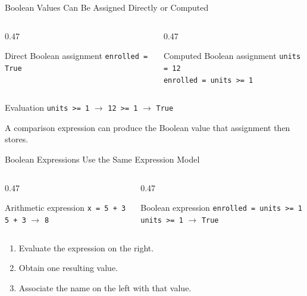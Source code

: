 \documentclass[aspectratio=169,10pt]{beamer}
\begin{document}
\begin{frame}{Boolean Values Can Be Assigned Directly or Computed}
  \begin{columns}[T,onlytextwidth]
    \begin{column}{0.47\textwidth}
      \begin{block}{Direct Boolean assignment}
        \centering
        \texttt{enrolled = True}
      \end{block}
    \end{column}

    \begin{column}{0.47\textwidth}
      \begin{block}{Computed Boolean assignment}
        \texttt{units = 12}\\
        \texttt{enrolled = units >= 1}
      \end{block}
    \end{column}
  \end{columns}

  \vspace{0.12in}

  \begin{block}{Evaluation}
    \centering
    \texttt{units >= 1} $\longrightarrow$ \texttt{12 >= 1} $\longrightarrow$ \texttt{True}
  \end{block}

  \begin{keyidea}
    A comparison expression can produce the Boolean value that assignment then stores.
  \end{keyidea}
\end{frame}

\begin{frame}{Boolean Expressions Use the Same Expression Model}
  \begin{columns}[T,onlytextwidth]
    \begin{column}{0.47\textwidth}
      \begin{block}{Arithmetic expression}
        \texttt{x = 5 + 3}\\[0.08in]
        \texttt{5 + 3} $\longrightarrow$ \texttt{8}
      \end{block}
    \end{column}

    \begin{column}{0.47\textwidth}
      \begin{block}{Boolean expression}
        \texttt{enrolled = units >= 1}\\[0.08in]
        \texttt{units >= 1} $\longrightarrow$ \texttt{True}
      \end{block}
    \end{column}
  \end{columns}

  \begin{enumerate}
    \item Evaluate the expression on the right.
    \item Obtain one resulting value.
    \item Associate the name on the left with that value.
  \end{enumerate}
\end{frame}
\end{document}
